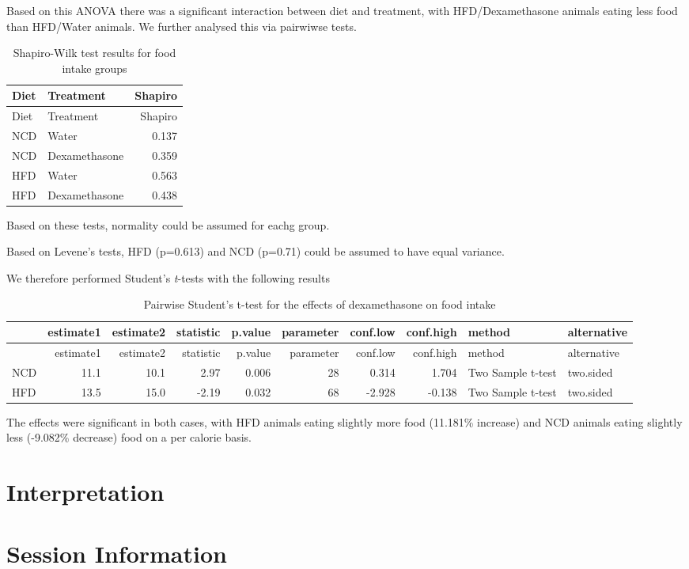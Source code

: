 \documentclass[]{article}
\begin{document}
Based on this ANOVA there was a significant interaction between diet and
treatment, with HFD/Dexamethasone animals eating less food than
HFD/Water animals. We further analysed this via pairwiwse tests.

\begin{longtable}[]{@{}llr@{}}
\caption{Shapiro-Wilk test results for food intake
groups}\tabularnewline
\toprule
Diet & Treatment & Shapiro\tabularnewline
\midrule
\endfirsthead
\toprule
Diet & Treatment & Shapiro\tabularnewline
\midrule
\endhead
NCD & Water & 0.137\tabularnewline
NCD & Dexamethasone & 0.359\tabularnewline
HFD & Water & 0.563\tabularnewline
HFD & Dexamethasone & 0.438\tabularnewline
\bottomrule
\end{longtable}

Based on these tests, normality could be assumed for eachg group.

Based on Levene's tests, HFD (p=0.613) and NCD (p=0.71) could be assumed
to have equal variance.

We therefore performed Student's \emph{t}-tests with the following
results

\begin{longtable}[]{@{}lrrrrrrrll@{}}
\caption{Pairwise Student's t-test for the effects of dexamethasone on
food intake}\tabularnewline
\toprule
& estimate1 & estimate2 & statistic & p.value & parameter & conf.low &
conf.high & method & alternative\tabularnewline
\midrule
\endfirsthead
\toprule
& estimate1 & estimate2 & statistic & p.value & parameter & conf.low &
conf.high & method & alternative\tabularnewline
\midrule
\endhead
NCD & 11.1 & 10.1 & 2.97 & 0.006 & 28 & 0.314 & 1.704 & Two Sample
t-test & two.sided\tabularnewline
HFD & 13.5 & 15.0 & -2.19 & 0.032 & 68 & -2.928 & -0.138 & Two Sample
t-test & two.sided\tabularnewline
\bottomrule
\end{longtable}

The effects were significant in both cases, with HFD animals eating
slightly more food (11.181\% increase) and NCD animals eating slightly
less (-9.082\% decrease) food on a per calorie basis.

\section{Interpretation}\label{interpretation}

\section{Session Information}\label{session-information}
\end{document}
